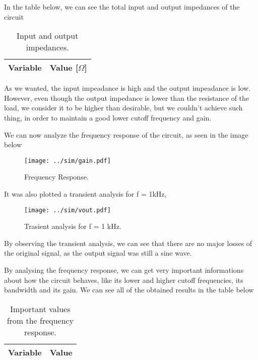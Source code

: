 In the table below, we can see the total input and output impedances of the circuit

\begin{table}[H]
  \centering
  \begin{tabular}{|l|r|}
    \hline    
    {\bf Variable} & {\bf Value [$\Omega$]} \\ \hline
    
    
  \end{tabular}
  \caption{Input and output impedances.}
\end{table}

As we wanted, the input impeadance is high and the output impeadance is low. However, even though the output impedance is lower than the resistance of the load, we consider it to be higher than desirable, but we couldn't achieve such thing, in order to maintain a good lower cutoff frequency and gain.

We can now analyze the frequency response of the circuit, as seen in the image below

\begin{figure}[H] \centering
\texttt{[image: ../sim/gain.pdf]}
\caption{Frequency Response.}
\end{figure}



It was also plotted a transient analysis for f = 1kHz, 

\begin{figure}[H] \centering
\texttt{[image: ../sim/vout.pdf]}
\caption{Trasient analysis for f = 1 kHz.}
\end{figure}

By observing the transient analysis, we can see that there are no major losses of the original signal, as the output signal was still a sine wave.
\par
By analysing the frequency response, we can get very important informations about how the circuit behaves, like its lower and higher cutoff frequencies, its bandwidth and its gain. We can see all of the obtained results in the table below

\begin{table}[H]
  \centering
  \begin{tabular}{|l|r|}
    \hline    
    {\bf Variable} & {\bf Value} \\ \hline
    
  \end{tabular}
  \caption{Important values from the frequency response.}
\end{table}

